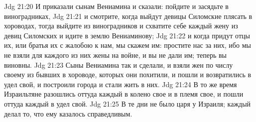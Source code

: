 \vs Jdg 21:20 И приказали сынам Вениамина и сказали: пойдите и засядьте в виноградниках,
\vs Jdg 21:21 и смотрите, когда выйдут девицы Силомские плясать в хороводах, тогда выйдите из виноградников и схватите себе каждый жену из девиц Силомских и идите в землю Вениаминову;
\vs Jdg 21:22 и когда придут отцы их, или братья их с жалобою к нам, мы скажем им: простите нас за них, ибо мы не взяли для каждого из них жены на войне, и вы не дали им; теперь вы виновны.
\vs Jdg 21:23 Сыны Вениамина так и сделали, и взяли жен по числу своему из бывших в хороводе, которых они похитили, и пошли и возвратились в удел свой, и построили города и стали жить в них.
\vs Jdg 21:24 В то же время Израильтяне разошлись оттуда каждый в колено свое и в племя свое, и пошли оттуда каждый в удел свой.
\rsbpar\vs Jdg 21:25 В те дни не было царя у Израиля; каждый делал то, что ему казалось справедливым.

